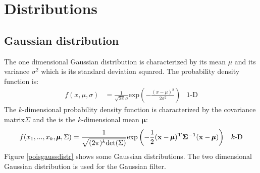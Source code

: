 \section{Distributions}
\subsection{Gaussian distribution}
The one dimensional Gaussian distribution is characterized by its mean $\mu$ and its variance $\sigma^2$ which is its standard deviation squared. The probability density function is:
\begin{align}
f(x,\mu,\sigma) &= \frac{1}{\sqrt{2\pi}\sigma}\text{exp}\left(-\frac{(x-\mu)^2}{2\sigma^2}\right)&\text{1-D}
\end{align}
The $k$-dimensional probability density function is characterized by the covariance matrix$\Sigma$ and the is the $k$-dimensional mean $\pmb{\mu}$:
\begin{align}
f(x_1,...,x_k,\pmb{\mu},\Sigma)&=\frac{1}{\sqrt{(2\pi)^k \text{det}(\Sigma)}}\text{exp}\left(-\frac{1}{2}(\bf{x}-\pmb{\mu})^T\Sigma^{-1}(\bf{x}-\pmb{\mu})\right) &\text{$k$-D}
\end{align}
Figure \ref{poisgaussdistr} shows some Gaussian distributions. The two dimensional Gaussian distribution is used for the Gaussian filter.
